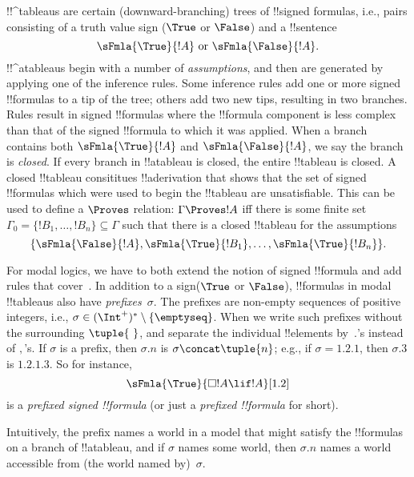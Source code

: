 \documentclass[../../../include/open-logic-section]{subfiles}
\begin{document}


!!^{tableau}s are certain (downward-branching) trees of !!{signed
  formula}s, i.e., pairs consisting of a truth value sign ($\True$ or
$\False$) and a !!{sentence}
\[
\sFmla{\True}{!A} \text{ or } \sFmla{\False}{!A}.
\]
!!^a{tableau}s begin with a number of \emph{assumptions}, and then are
generated by applying one of the inference rules. Some inference rules
add one or more signed !!{formula}s to a tip of the tree; others add
two new tips, resulting in two branches.  Rules result in signed
!!{formula}s where the !!{formula} component is less complex than that
of the signed !!{formula} to which it was applied. When a branch
contains both $\sFmla{\True}{!A}$ and $\sFmla{\False}{!A}$, we say the
branch is \emph{closed}. If every branch in !!a{tableau} is closed,
the entire !!{tableau} is closed. A closed !!{tableau} consititues
!!a{derivation} that shows that the set of signed !!{formula}s which
were used to begin the !!{tableau} are unsatisfiable.
This can be used to define a $\Proves$ relation: 
$\Gamma \Proves !A$ iff there is some finite set~$\Gamma_0 = \{!B_1,
\dots, !B_n\} \subseteq \Gamma$ such that there is a closed !!{tableau}
for the assumptions
\[
\{\sFmla{\False}{!A}, \sFmla{\True}{!B_1}, \dots, \sFmla{\True}{!B_n}\}.
\]

For modal logics, we have to both extend the notion of signed
!!{formula} and add rules that
cover~. In addition to a sign($\True$ or
$\False$), !!{formula}s in modal !!{tableau}s also have
\emph{prefixes}~$\sigma$. The prefixes are non-empty sequences of
positive integers, i.e., $\sigma \in (\Int^+)^* \setminus
\{\emptyseq\}$. When we write such prefixes without the surrounding
$\tuple{\ }$, and separate the individual !!{element}s by~$.$'s
instead of $,$'s. If $\sigma$ is a prefix, then $\sigma.n$ is $\sigma
\concat \tuple{n}$; e.g., if $\sigma = 1.2.1$, then $\sigma.3$ is
$1.2.1.3$. So for instance,
\[
\sFmla{\True}{\Box !A \lif !A}[1.2]
\]
is a \emph{prefixed signed !!{formula}} (or just a \emph{prefixed
  !!{formula}} for short).

Intuitively, the prefix names a world in a model that might satisfy
the !!{formula}s on a branch of !!a{tableau}, and if $\sigma$ names
some world, then $\sigma.n$ names a world accessible from (the world
named by)~$\sigma$.
\end{document}
